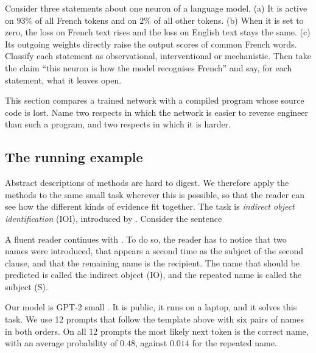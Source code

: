 \begin{exercise}\label{ex:evidence}
Consider three statements about one neuron of a language model. (a) It is active on $93\%$ of all French tokens
and on $2\%$ of all other tokens. (b) When it is set to zero, the loss on French text rises and the loss on English
text stays the same. (c) Its outgoing weights directly raise the output scores of common French
words. Classify each statement as observational, interventional or mechanistic. Then take the claim ``this
neuron is how the model recognises French'' and say, for each statement, what it leaves open.
\end{exercise}

\begin{exercise}\label{ex:binary}
This section compares a trained network with a compiled program whose source code is lost. Name two respects in
which the network is easier to reverse engineer than such a program, and two respects in which it is harder.
\end{exercise}

\subsection{The running example}
\label{sec:running}

Abstract descriptions of methods are hard to digest. We therefore apply the methods to the same small task
wherever this is possible, so
that the reader can see how the different kinds of evidence fit together. The task is \emph{indirect object
identification} (IOI), introduced by \citet{wang2023interpretability}. Consider the sentence
\begin{center}
\end{center}
A fluent reader continues with . To do so, the reader has to notice that two names were introduced, that
 appears a second time as the subject of the second clause, and that the remaining name is the
recipient. The name that should be predicted is called the indirect object (IO), and the repeated name is called
the subject (S).

Our model is GPT-2 small \citep{radford2019language}. It is public, it runs on a laptop, and it solves this task.
We use 12 prompts that follow the template above with six pairs of names in both orders. On all 12 prompts the
most likely next token is the correct name, with an average probability of $0.48$, against $0.014$ for the
repeated name.

